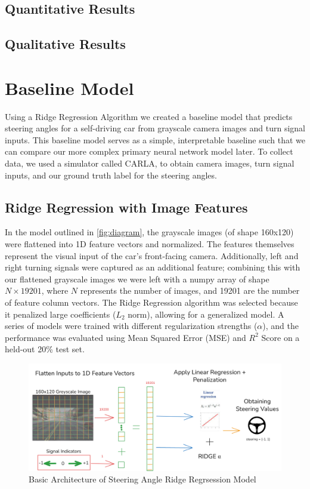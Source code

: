 \documentclass{article} %
\begin{document}
\subsection{Quantitative Results}

\subsection{Qualitative Results}

\section{Baseline Model}

Using a Ridge Regression Algorithm we created a baseline model that predicts steering angles for a self-driving car
from grayscale camera images and turn signal inputs. This baseline model serves as a simple, interpretable baseline
such that we can compare our more complex primary neural network model later. To collect data, we used a simulator
called CARLA, to obtain camera images, turn signal inputs, and our ground truth label for the steering angles.


\subsection{Ridge Regression with Image Features}

In the model outlined in \autoref{fig:diagram}, the grayscale images (of shape 160x120) were flattened into 1D feature vectors and normalized. The features themselves
represent the visual input of the car's front-facing camera. Additionally, left and right turning signals were captured as an
additional feature; combining this with our flattened grayscale images we were left with a numpy array of shape $N \times 19201$,
where $N$ represents the number of images, and 19201 are the number of feature column vectors. The Ridge Regression algorithm was
selected because it penalized large coefficients ($L_2$ norm), allowing for a generalized model. A series of models were trained
with different regularization strengths ($\alpha$), and the performance was evaluated using Mean Squared Error (MSE) and $R^2$ Score
on a held-out 20\% test set.

\begin{figure}[H] %
    \centering
    \includegraphics[width=1.0\textwidth]{diagram.png} %
    \caption{Basic Architecture of Steering Angle  Ridge Regrsession Model}
    \label{fig:diagram}
\end{figure}
\end{document}
